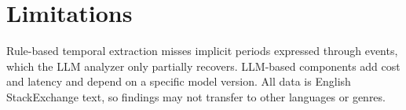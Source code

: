 \section*{Limitations}
Rule-based temporal extraction misses implicit periods expressed through events, which the
LLM analyzer only partially recovers. LLM-based components add cost and latency and depend on a
specific model version. All data is English StackExchange text, so findings may not transfer to
other languages or genres. 
